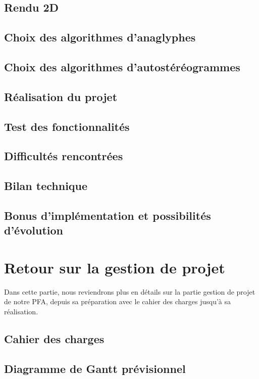 \documentclass[paper=a4, fontsize=12pt]{article}
\newenvironment{changemargin}[2]{\begin{list}{}{%
      \setlength{\topsep}{0pt}%
      \setlength{\leftmargin}{0pt}%
      \setlength{\rightmargin}{0pt}%
      \setlength{\listparindent}{\parindent}%
      \setlength{\itemindent}{\parindent}%
      \setlength{\parsep}{0pt plus 1pt}%
      \addtolength{\leftmargin}{#1}%
      \addtolength{\rightmargin}{#2}%
    }\item }{\end{list}}
\numberwithin{equation}{section}		%
\numberwithin{figure}{section}			%
\numberwithin{table}{section}				%
\begin{document}
\begin{changemargin}{-1cm}{-1cm}
  \subsection{Rendu 2D}
  
  \subsection{Choix des algorithmes d'anaglyphes}
  
  \subsection{Choix des algorithmes d'autostéréogrammes}
  
  \subsection{Réalisation du projet}
  
  \subsection{Test des fonctionnalités}
  
  \subsection{Difficultés rencontrées}
  
  \subsection{Bilan technique}
  
  \subsection{Bonus d'implémentation et possibilités d'évolution}
  
  \newpage

  \section{Retour sur la gestion de projet}
  Dans cette partie, nous reviendrons plus en détails sur la partie gestion de projet de notre PFA, depuis sa préparation avec le cahier des charges jusqu'à sa réalisation.
  \subsection{Cahier des charges}
  
  \subsection{Diagramme de Gantt prévisionnel}
  

\end{changemargin}
\end{document}
